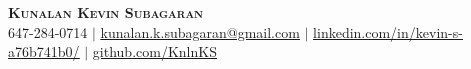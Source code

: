 \begin{center}
	\textbf{\Huge \scshape Kunalan Kevin Subagaran} \\ \vspace{1pt}
	\small 647-284-0714 $|$
    \href{kunalan.k.subagaran@gmail.com}{\underline{kunalan.k.subagaran@gmail.com}} $|$ 
	\href{https://www.linkedin.com/in/kevin-s-a76b741b0/}{\underline{linkedin.com/in/kevin-s-a76b741b0/}} $|$
	\href{https://github.com/KnlnKS}{\underline{github.com/KnlnKS}}
\end{center}